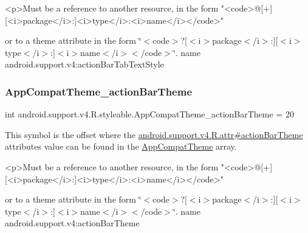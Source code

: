 \begin{DoxyVerb}      <p>Must be a reference to another resource, in the form "<code>@[+][<i>package</i>:]<i>type</i>:<i>name</i></code>"
\end{DoxyVerb}
 or to a theme attribute in the form \char`\"{}$<$code$>$?\mbox{[}$<$i$>$package$<$/i$>$\+:\mbox{]}\mbox{[}$<$i$>$type$<$/i$>$\+:\mbox{]}$<$i$>$name$<$/i$>$$<$/code$>$\char`\"{}.  name android.\+support.\+v4\+:action\+Bar\+Tab\+Text\+Style \mbox{\label{classandroid_1_1support_1_1v4_1_1R_1_1styleable_a0a71bc29ce92a20e2a10e528565e55bf}} 
\subsubsection{\texorpdfstring{App\+Compat\+Theme\+\_\+action\+Bar\+Theme}{AppCompatTheme\_actionBarTheme}}
{\footnotesize\ttfamily int android.\+support.\+v4.\+R.\+styleable.\+App\+Compat\+Theme\+\_\+action\+Bar\+Theme = 20\hspace{0.3cm}{\ttfamily [static]}}

This symbol is the offset where the \hyperlink{classandroid_1_1support_1_1v4_1_1R_1_1attr_a7324d49e9fadad73f4d0c0a49f02fbcc}{android.\+support.\+v4.\+R.\+attr\#action\+Bar\+Theme} attribute\textquotesingle{}s value can be found in the \hyperlink{classandroid_1_1support_1_1v4_1_1R_1_1styleable_ac07ebbe62ed977f6dcaadc6397840ace}{App\+Compat\+Theme} array.

\begin{DoxyVerb}      <p>Must be a reference to another resource, in the form "<code>@[+][<i>package</i>:]<i>type</i>:<i>name</i></code>"
\end{DoxyVerb}
 or to a theme attribute in the form \char`\"{}$<$code$>$?\mbox{[}$<$i$>$package$<$/i$>$\+:\mbox{]}\mbox{[}$<$i$>$type$<$/i$>$\+:\mbox{]}$<$i$>$name$<$/i$>$$<$/code$>$\char`\"{}.  name android.\+support.\+v4\+:action\+Bar\+Theme \mbox{\label{classandroid_1_1support_1_1v4_1_1R_1_1styleable_a0d30112c3d0cc880197dd311dbbf7def}} 
